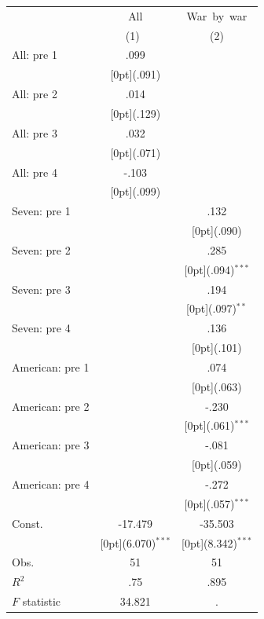 \documentclass[12pt,a4paper,titlepage]{article}
\begin{document}
{ \label{tab:title} 
\begin{tabular*}{\textwidth}{@{\extracolsep{\fill}}lcc}		
	& \multicolumn{1}{c}{All} &	\multicolumn{1}{c}{War~by~war} \\
\cline{2-3}		
	& \multicolumn{1}{c}{(1)\mbox{\ }} &	\multicolumn{1}{c}{(2)} \\
\hline		
All: pre 1 &	.099 &	\\
&	\raisebox{.7ex}[0pt]{\scriptsize (.091)} &	\\
All: pre 2 &	.014 &	\\
&	\raisebox{.7ex}[0pt]{\scriptsize (.129)} &	\\
All: pre 3 &	.032 &	\\
&	\raisebox{.7ex}[0pt]{\scriptsize (.071)} &	\\
All: pre 4 &	-.103 &	\\
&	\raisebox{.7ex}[0pt]{\scriptsize (.099)} &	\\
Seven: pre 1 &	&	.132 \\
&	&	\raisebox{.7ex}[0pt]{\scriptsize (.090)} \\
Seven: pre 2 &	&	.285 \\
&	&	\raisebox{.7ex}[0pt]{\scriptsize (.094)$^{***}$} \\
Seven: pre 3 &	&	.194 \\
&	&	\raisebox{.7ex}[0pt]{\scriptsize (.097)$^{**}$} \\
Seven: pre 4 &	&	.136 \\
&	&	\raisebox{.7ex}[0pt]{\scriptsize (.101)} \\
American: pre 1 &	&	.074 \\
&	&	\raisebox{.7ex}[0pt]{\scriptsize (.063)} \\
American: pre 2 &	&	-.230 \\
&	&	\raisebox{.7ex}[0pt]{\scriptsize (.061)$^{***}$} \\
American: pre 3 &	&	-.081 \\
&	&	\raisebox{.7ex}[0pt]{\scriptsize (.059)} \\
American: pre 4 &	&	-.272 \\
&	&	\raisebox{.7ex}[0pt]{\scriptsize (.057)$^{***}$} \\
Const. &	-17.479 &	-35.503 \\
&	\raisebox{.7ex}[0pt]{\scriptsize (6.070)$^{***}$} &	\raisebox{.7ex}[0pt]{\scriptsize (8.342)$^{***}$} \\
Obs. &	51 &	51 \\
$ R^2$ &	.75 &	.895 \\
$ F$ statistic &	34.821 &	. \\
\hline\hline		
\end{tabular*}

}
\end{document}
